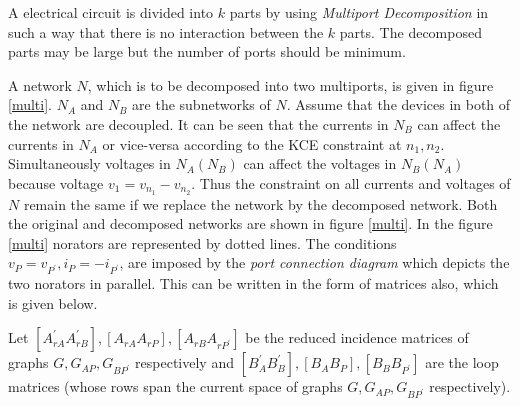 \documentclass[12pt,psfig,a4]{article}
\begin{document}
A electrical circuit is divided into $k$ parts by using {\it Multiport Decomposition} \cite{HN} in such a way that there is no 
interaction between the $k$ parts. The decomposed parts may be large but the number of ports should be minimum. \par

A network $N$, which is to be decomposed into two multiports, is given in figure \ref{multi}. $N_{A}$ and $N_{B}$ are the 
subnetworks of $N$. Assume that the devices in both of the network are decoupled.
It can be seen that the currents in $N_{B}$ can affect the currents in $N_{A}$ or vice-versa
according to the KCE constraint at $n_{1},n_{2}$. Simultaneously voltages in $N_{A}(N_{B})$ can affect the
voltages in $N_{B}(N_{A})$ because voltage $v_{1} = v_{n_{1}} - v_{n_{2}}$. Thus the constraint on
all currents and voltages of $N$ remain the same if we replace the network by the decomposed network. Both 
the original and decomposed networks are shown in figure \ref{multi}. In the figure \ref{multi} norators are 
represented by dotted lines. The conditions $v_{P} = v_{P^{'}}, i_{P} = -i_{P^{'}}$, are imposed by the 
{\it port connection diagram} which depicts the two norators in parallel. This can be written in the form 
of matrices also, which is given below.\par 

\hspace{1in}Let $[A_{rA}^{'} A_{rB}^{'}], [A_{rA} A_{rP}], [A_{rB} A_{rP^{'}}]$
be the reduced incidence matrices of graphs $G, G_{AP}, G_{BP^{'}}$ respectively and $[B_{A}^{'}
B_{B}^{'}], [B_{A} B_{P}], [B_{B} B_{P^{'}}]$ are the loop matrices (whose rows span the current space
of graphs $G, G_{AP}, G_{BP^{'}}$ respectively).
\end{document}
